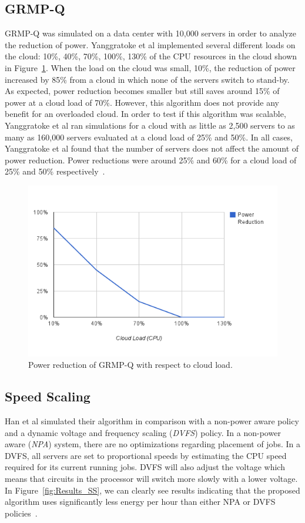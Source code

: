 \documentclass{sig-alternate}
\begin{document}
\subsection{GRMP-Q}
\label{sec:GRMP-Q}

GRMP-Q was simulated on a data center with 10,000 servers in order to analyze the reduction of power. Yanggratoke et al implemented several different loads on the cloud: 10\%, 40\%, 70\%, 100\%, 130\% of the CPU resources in the cloud shown in Figure~\ref{fig:Results_PR}. When the load on the cloud was small, 10\%, the reduction of power increased by 85\% from a cloud in which none of the servers switch to stand-by. As expected, power reduction becomes smaller but still saves around 15\% of power at a cloud load of 70\%.  However, this algorithm does not provide any benefit for an overloaded cloud.  In order to test if this algorithm was scalable, Yanggratoke et al ran simulations for a cloud with as little as 2,500 servers to as many as 160,000 servers evaluated at a cloud load of 25\% and 50\%. In all cases, Yanggratoke et al found that the number of servers does not affect the amount of power reduction. Power reductions were around 25\% and 60\% for a cloud load of 25\% and 50\% respectively~\cite{Yanggratoke}.  


\begin{figure}[tb]
 \includegraphics[height=0.35 \textwidth]{image}
 \caption{Power reduction of GRMP-Q with respect to cloud load. }
 \label{fig:Results_PR}
\end{figure}

\subsection{Speed Scaling}
\label{sec:SS}

Han et al simulated their algorithm in comparison with a non-power aware policy and a dynamic voltage and frequency scaling (\emph{DVFS}) policy. In a non-power aware (\emph{NPA}) system, there are no optimizations regarding placement of jobs. In a DVFS, all servers are set to proportional speeds by estimating the CPU speed required for its current running jobs. DVFS will also adjust the voltage which means that circuits in the processor will switch more slowly with a lower voltage. In Figure~\ref{fig:Results_SS},  we can clearly see results indicating that the proposed algorithm uses significantly less energy per hour than either NPA or DVFS policies~\cite{Han}.
\end{document}
